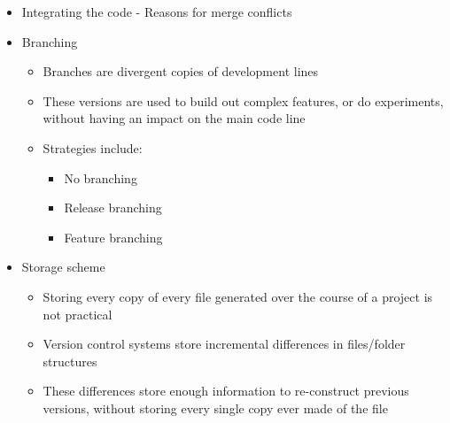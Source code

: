 \begin{itemize}
		\item Integrating the code - Reasons for merge conflicts\\[-15pt]

		\item Branching
		\begin{itemize}
			\item Branches are divergent copies of development lines
			\item These versions are used to build out complex features, or do experiments,
			without having an impact on the main code line
			\item Strategies include:
			\begin{itemize}
				\item No branching
				\item Release branching
				\item Feature branching
			\end{itemize}
		\end{itemize}

		\item Storage scheme
		\begin{itemize}
			\item Storing every copy of every file generated over the course of a project is not practical
			\item Version control systems store incremental differences in files/folder structures
			\item These differences store enough information to re-construct previous versions, without storing every single copy ever made of the file
		\end{itemize}


\end{itemize}
